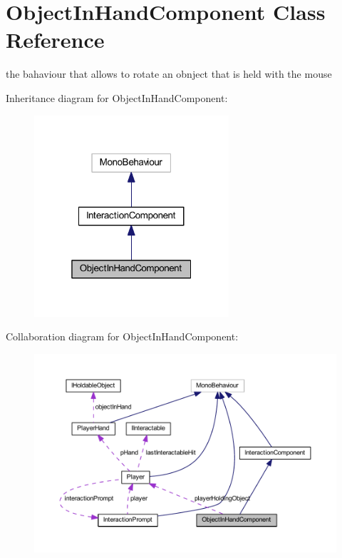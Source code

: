 \hypertarget{class_object_in_hand_component}{}\section{Object\+In\+Hand\+Component Class Reference}
\label{class_object_in_hand_component}


the bahaviour that allows to rotate an obnject that is held with the mouse  




Inheritance diagram for Object\+In\+Hand\+Component\+:
\nopagebreak
\begin{figure}[H]
\begin{center}
\leavevmode
\includegraphics[width=205pt]{class_object_in_hand_component__inherit__graph}
\end{center}
\end{figure}


Collaboration diagram for Object\+In\+Hand\+Component\+:
\nopagebreak
\begin{figure}[H]
\begin{center}
\leavevmode
\includegraphics[width=350pt]{class_object_in_hand_component__coll__graph}
\end{center}
\end{figure}
